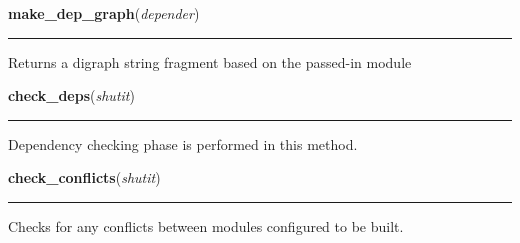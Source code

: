    \label{shutit_main:make_dep_graph}

    \vspace{0.5ex}

\hspace{.8\funcindent}\begin{boxedminipage}{\funcwidth}

    \raggedright \textbf{make\_dep\_graph}(\textit{depender})

    \vspace{-1.5ex}

    \rule{\textwidth}{0.5\fboxrule}
\setlength{\parskip}{2ex}
    Returns a digraph string fragment based on the passed-in module

\setlength{\parskip}{1ex}
    \end{boxedminipage}

    \label{shutit_main:check_deps}

    \vspace{0.5ex}

\hspace{.8\funcindent}\begin{boxedminipage}{\funcwidth}

    \raggedright \textbf{check\_deps}(\textit{shutit})

    \vspace{-1.5ex}

    \rule{\textwidth}{0.5\fboxrule}
\setlength{\parskip}{2ex}
    Dependency checking phase is performed in this method.

\setlength{\parskip}{1ex}
    \end{boxedminipage}

    \label{shutit_main:check_conflicts}

    \vspace{0.5ex}

\hspace{.8\funcindent}\begin{boxedminipage}{\funcwidth}

    \raggedright \textbf{check\_conflicts}(\textit{shutit})

    \vspace{-1.5ex}

    \rule{\textwidth}{0.5\fboxrule}
\setlength{\parskip}{2ex}
    Checks for any conflicts between modules configured to be built.

\setlength{\parskip}{1ex}
    \end{boxedminipage}

